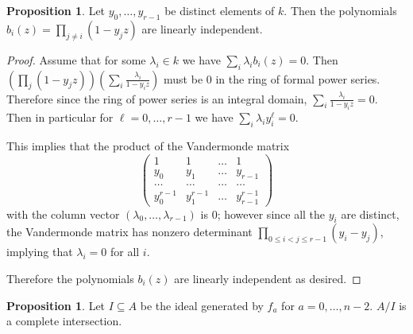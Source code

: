 \documentclass{amsart}
\numberwithin{equation}{section}
\theoremstyle{definition}
\newtheorem{proposition}[equation]{Proposition}
\begin{document}
\begin{proposition}\label{prop:vand}Let $y_0, \ldots, y_{r - 1}$ be distinct elements of $k$.  Then the polynomials $b_i(z) = \prod_{j \neq i} (1 - y_j z)$ are linearly independent.
\end{proposition}

\begin{proof} 

Assume that for some $\lambda_i \in k$ we have $\sum_i \lambda_ib_i(z)=0$.  Then $\left(\prod_j (1-y_jz)\right)\left(\sum_i \frac{\lambda_i}{1-y_iz}\right)$ must be $0$ in the ring of formal power series. Therefore since the ring of power series is an integral domain, $\sum_i \frac{\lambda_i}{1-y_iz}=0$. Then in particular for $\ell=0,\dots,r-1$ we have $\sum_i \lambda_iy_i^\ell=0$.

This implies that the product of the Vandermonde matrix $$\left(\begin{matrix} 1& 1& \dots& 1\\y_0&y_1&\dots&y_{r-1}\\\dots&\dots&\dots&\dots\\y_0^{r-1}&y_1^{r-1}&\dots&y_{r-1}^{r-1}\end{matrix}\right)$$ with the column vector $(\lambda_0,\dots,\lambda_{r-1})$ is $0$; however since all the $y_i$ are distinct, the Vandermonde matrix has nonzero determinant $\prod_{0 \le i < j \le r-1} (y_i-y_j)$, implying that $\lambda_i=0$ for all $i$. 

Therefore the polynomials $b_i(z)$ are linearly independent as desired.

\end{proof}


\begin{proposition}\label{prop:ci} Let $I \subseteq A$ be the ideal generated by $f_a$ for $a=0,\dots,n-2$. $A/I$ is a complete intersection. 
\end{proposition}
\end{document}
